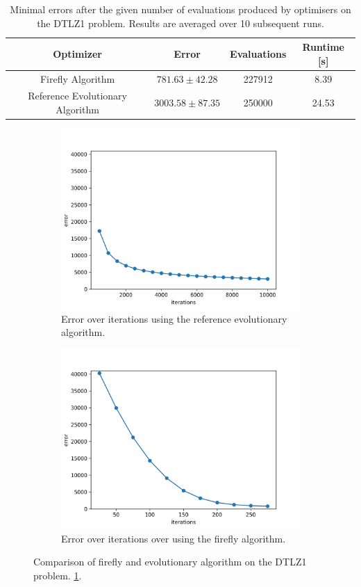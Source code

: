 \begin{table}[H]
  \centering
   \begin{tabular}{|c c c c|}
     \hline
     \textbf{Optimizer} & \textbf{Error} & \textbf{Evaluations} & \textbf{Runtime [s]} \\
     \hline
     Firefly Algorithm & $781.63 \pm 42.28$ & 227912 & 8.39 \\
     Reference Evolutionary Algorithm & $3003.58 \pm 87.35$ & 250000 & 24.53 \\
     \hline
  \end{tabular}
  \caption{Minimal errors after the given number of evaluations produced by optimisers on the DTLZ1 problem. Results are averaged over 10 subsequent runs.}
  \label{tab:firefly_vs_ea}
\end{table}

\begin{figure}
  \centering
  \begin{subfigure}{.5\textwidth}
    \centering
    \captionsetup{width=0.75\linewidth}
    \includegraphics[width=0.75\linewidth]{assets/reference.png}
    \caption{Error over iterations using the reference evolutionary algorithm.}
    \label{fig:sub1}
  \end{subfigure}%
  \begin{subfigure}{.5\textwidth}
    \centering
    \captionsetup{width=0.75\linewidth}
    \includegraphics[width=0.75\linewidth]{assets/firefly.png}
    \caption{Error over iterations over using the firefly algorithm.}
    \label{fig:sub2}
  \end{subfigure}
  \caption{Comparison of firefly and evolutionary algorithm on the DTLZ1 problem. \ref{tab:firefly_vs_ea}.}
  \label{fig:firefly_vs_ea}
\end{figure}


